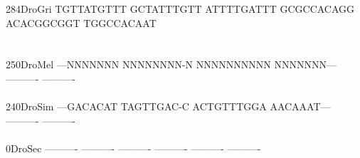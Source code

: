 \documentclass[11pt,twoside,reqno,a4paper]{article}
\begin{document}
{284\hspace*{1\charwidth}DroGri	TGTTATGTTT	GCTATTTGTT	ATTTTGATTT	GCGCCACAGG	ACACGGCGGT	TGGCCACAAT	\\
\hspace*{4\charwidth}\hspace*{7\charwidth}\hspace*{1\charwidth}\hspace*{1\charwidth}\hspace*{1\charwidth}\hspace*{1\charwidth}\hspace*{1\charwidth}\hspace*{1\charwidth}\\
\\
250\hspace*{1\charwidth}DroMel	---NNNNNNN	NNNNNNNN-N	NNNNNNNNNN	NNNNNNN---	----------	----------	\\
\hspace*{4\charwidth}\hspace*{7\charwidth}\hspace*{1\charwidth}\hspace*{1\charwidth}\hspace*{1\charwidth}\hspace*{1\charwidth}\hspace*{1\charwidth}\hspace*{1\charwidth}\\
240\hspace*{1\charwidth}DroSim	---GACACAT	TAGTTGAC-C	ACTGTTTGGA	AACAAAT---	----------	----------	\\
\hspace*{4\charwidth}\hspace*{7\charwidth}\hspace*{1\charwidth}\hspace*{1\charwidth}\hspace*{1\charwidth}\hspace*{1\charwidth}\hspace*{1\charwidth}\hspace*{1\charwidth}\\
0\hspace*{3\charwidth}DroSec	----------	----------	----------	----------	----------	----------	\\
\hspace*{4\charwidth}\hspace*{7\charwidth}\hspace*{1\charwidth}\hspace*{1\charwidth}\hspace*{1\charwidth}\hspace*{1\charwidth}\hspace*{1\charwidth}\hspace*{1\charwidth}\\
}
\end{document}
